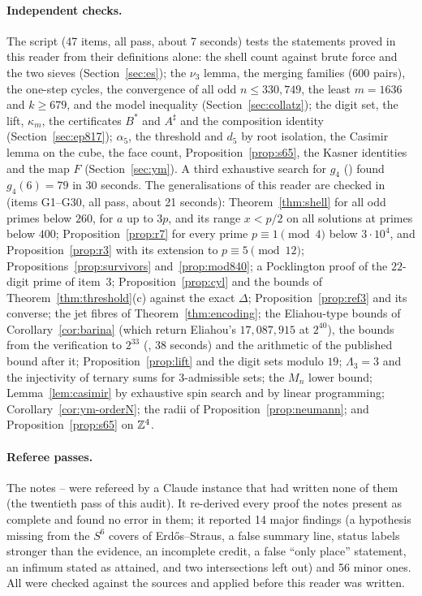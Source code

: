 \paragraph{Independent checks.} The script  (47 items, all pass, about 7 seconds) tests the statements proved in this reader from their definitions alone: the shell count against brute force and the two sieves (Section~\ref{sec:es}); the $\nu_3$ lemma, the merging families (600 pairs), the one-step cycles, the convergence of all odd $n\le330{,}749$, the least $m=1636$ and $k\ge679$, and the model inequality (Section~\ref{sec:collatz}); the digit set, the lift, $\kappa_m$, the certificates $B^*$ and $A^\sharp$ and the composition identity (Section~\ref{sec:ep817}); $\alpha_5$, the threshold and $d_5$ by root isolation, the Casimir lemma on the cube, the face count, Proposition~\ref{prop:s65}, the Kasner identities and the map $F$ (Section~\ref{sec:ym}). A third exhaustive search for $g_4$ () found $g_4(6)=79$ in 30 seconds. The generalisations of this reader are checked in  (items G1--G30, all pass, about 21 seconds): Theorem~\ref{thm:shell} for all odd primes below $260$, for $a$ up to $3p$, and its range $x<p/2$ on all solutions at primes below $400$; Proposition~\ref{prop:r7} for every prime $p\equiv1\pmod4$ below $3\cdot10^4$, and Proposition~\ref{prop:r3} with its extension to $p\equiv5\pmod{12}$; Propositions~\ref{prop:survivors} and~\ref{prop:mod840}; a Pocklington proof of the $22$-digit prime of item~3; Proposition~\ref{prop:cyl} and the bounds of Theorem~\ref{thm:threshold}(c) against the exact $\Delta$; Proposition~\ref{prop:ref3} and its converse; the jet fibres of Theorem~\ref{thm:encoding}; the Eliahou-type bounds of Corollary~\ref{cor:barina} (which return Eliahou's $17{,}087{,}915$ at $2^{40}$), the bounds from the verification to $2^{33}$ (, 38 seconds) and the arithmetic of the published bound after it; Proposition~\ref{prop:lift} and the digit sets modulo $19$; $\Lambda_3=3$ and the injectivity of ternary sums for $3$-admissible sets; the $M_n$ lower bound; Lemma~\ref{lem:casimir} by exhaustive spin search and by linear programming; Corollary~\ref{cor:ym-orderN}; the radii of Proposition~\ref{prop:neumann}; and Proposition~\ref{prop:s65} on $\mathbb{Z}^4$.

\paragraph{Referee passes.} The notes -- were refereed by a Claude instance that had written none of them (the twentieth pass of this audit). It re-derived every proof the notes present as complete and found no error in them; it reported 14 major findings (a hypothesis missing from the $S^6$ covers of Erdős--Straus, a false summary line, status labels stronger than the evidence, an incomplete credit, a false ``only place'' statement, an infimum stated as attained, and two intersections left out) and 56 minor ones. All were checked against the sources and applied before this reader was written.

